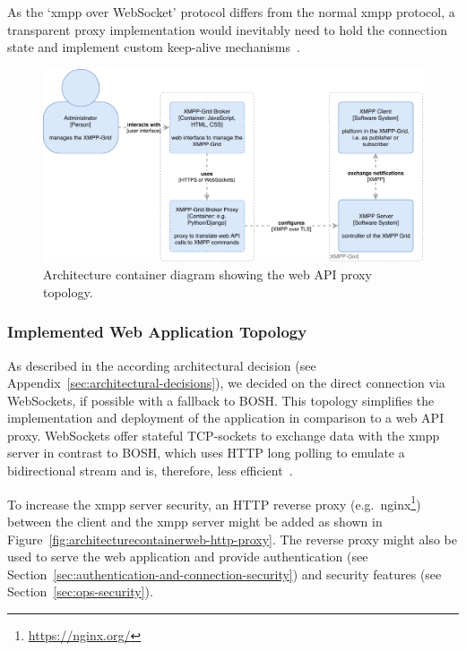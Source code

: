As the `\gls{xmpp} over WebSocket' protocol differs from the normal \gls{xmpp} protocol, a transparent proxy implementation would inevitably need to hold the connection state and implement custom keep-alive mechanisms~\cite{rfc7395}.

\begin{figure}[H]
\centering
\includegraphics[width=0.8\linewidth]{resources/architecture_container_proxy}
\caption[Architecture container diagram: Web proxy]{Architecture container diagram showing the web API proxy topology.}
\label{fig:architecturecontainerwebproxy}
\end{figure}

\subsubsection{Implemented Web Application Topology}\label{sec:implemented-web-application-topology}

As described in the according architectural decision (see Appendix~\ref{sec:architectural-decisions}), we decided on the direct connection via WebSockets, if possible with a fallback to BOSH.
This topology simplifies the implementation and deployment of the application in comparison to a web API proxy.
WebSockets offer stateful TCP-sockets to exchange data with the \gls{xmpp} server in contrast to BOSH, which uses HTTP long polling to emulate a bidirectional stream and is, therefore, less efficient~\cite{xep-0124}.

To increase the \gls{xmpp} server security, an HTTP reverse proxy (e.g.\ nginx\footnote{\url{https://nginx.org/}}) between the client and the \gls{xmpp} server might be added as shown in Figure~\ref{fig:architecturecontainerweb-http-proxy}.
The reverse proxy might also be used to serve the web application and provide authentication (see Section~\ref{sec:authentication-and-connection-security}) and security features (see Section~\ref{sec:ops-security}).

